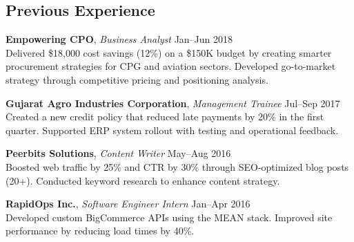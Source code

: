 \documentclass[]{deedy-resume-reversed}
\begin{document}
\begin{minipage}[t]{0.60\textwidth}

\subsection{Previous Experience}

\vspace{0.25em}

\textbf{Empowering CPO}, \textit{Business Analyst} \textbar{} Jan–Jun 2018\\
Delivered \$18,000 cost savings (12\%) on a \$150K budget by creating smarter procurement strategies for CPG and aviation sectors. Developed go-to-market strategy through competitive pricing and positioning analysis.

\vspace{0.25em}

\textbf{Gujarat Agro Industries Corporation}, \textit{Management Trainee} \textbar{} Jul–Sep 2017\\
Created a new credit policy that reduced late payments by 20\% in the first quarter. Supported ERP system rollout with testing and operational feedback.

\vspace{0.25em}

\textbf{Peerbits Solutions}, \textit{Content Writer} \textbar{} May–Aug 2016\\
Boosted web traffic by 25\% and CTR by 30\% through SEO-optimized blog posts (20+). Conducted keyword research to enhance content strategy.

\vspace{0.25em}

\textbf{RapidOps Inc.}, \textit{Software Engineer Intern} \textbar{} Jan–Apr 2016\\
Developed custom BigCommerce APIs using the MEAN stack. Improved site performance by reducing load times by 40\%.




\end{minipage}
\end{document}
